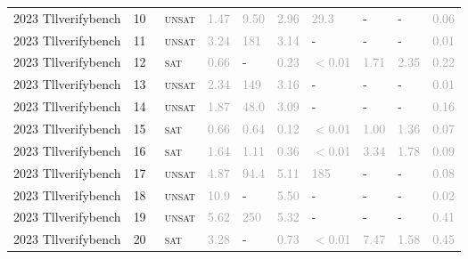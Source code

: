 \begin{center}
{\begin{longtable}{@{}llllllllll@{}}
2023 Tllverifybench & 10 & ~\textsc{unsat} & \textcolor{darkgray}{1.47} & \textcolor{darkgray}{9.50} & \textcolor{darkgray}{2.96} & \textcolor{darkgray}{29.3} & - & - & \textcolor{darkgray}{0.06} \\
2023 Tllverifybench & 11 & ~\textsc{unsat} & \textcolor{darkgray}{3.24} & \textcolor{darkgray}{181} & \textcolor{darkgray}{3.14} & - & - & - & \textcolor{darkgray}{0.01} \\
2023 Tllverifybench & 12 & ~\textsc{sat} & \textcolor{darkgray}{0.66} & - & \textcolor{darkgray}{0.23} & \textcolor{darkgray}{$<$0.01} & \textcolor{darkgray}{1.71} & \textcolor{darkgray}{2.35} & \textcolor{darkgray}{0.22} \\
2023 Tllverifybench & 13 & ~\textsc{unsat} & \textcolor{darkgray}{2.34} & \textcolor{darkgray}{149} & \textcolor{darkgray}{3.16} & - & - & - & \textcolor{darkgray}{0.01} \\
2023 Tllverifybench & 14 & ~\textsc{unsat} & \textcolor{darkgray}{1.87} & \textcolor{darkgray}{48.0} & \textcolor{darkgray}{3.09} & - & - & - & \textcolor{darkgray}{0.16} \\
2023 Tllverifybench & 15 & ~\textsc{sat} & \textcolor{darkgray}{0.66} & \textcolor{darkgray}{0.64} & \textcolor{darkgray}{0.12} & \textcolor{darkgray}{$<$0.01} & \textcolor{darkgray}{1.00} & \textcolor{darkgray}{1.36} & \textcolor{darkgray}{0.07} \\
2023 Tllverifybench & 16 & ~\textsc{sat} & \textcolor{darkgray}{1.64} & \textcolor{darkgray}{1.11} & \textcolor{darkgray}{0.36} & \textcolor{darkgray}{$<$0.01} & \textcolor{darkgray}{3.34} & \textcolor{darkgray}{1.78} & \textcolor{darkgray}{0.09} \\
2023 Tllverifybench & 17 & ~\textsc{unsat} & \textcolor{darkgray}{4.87} & \textcolor{darkgray}{94.4} & \textcolor{darkgray}{5.11} & \textcolor{darkgray}{185} & - & - & \textcolor{darkgray}{0.08} \\
2023 Tllverifybench & 18 & ~\textsc{unsat} & \textcolor{darkgray}{10.9} & - & \textcolor{darkgray}{5.50} & - & - & - & \textcolor{darkgray}{0.02} \\
2023 Tllverifybench & 19 & ~\textsc{unsat} & \textcolor{darkgray}{5.62} & \textcolor{darkgray}{250} & \textcolor{darkgray}{5.32} & - & - & - & \textcolor{darkgray}{0.41} \\
2023 Tllverifybench & 20 & ~\textsc{sat} & \textcolor{darkgray}{3.28} & - & \textcolor{darkgray}{0.73} & \textcolor{darkgray}{$<$0.01} & \textcolor{darkgray}{7.47} & \textcolor{darkgray}{1.58} & \textcolor{darkgray}{0.45} \\

\end{longtable}}
\end{center}
